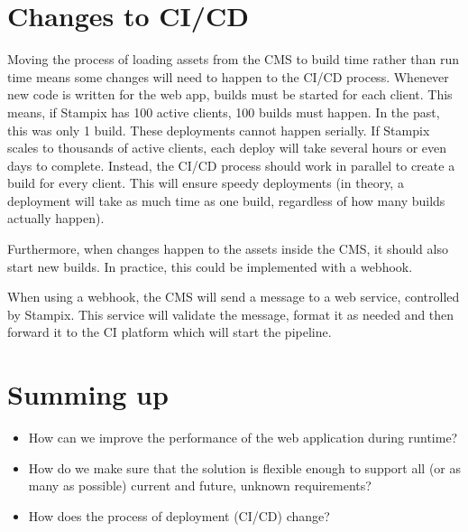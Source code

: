 \section{Changes to CI/CD}

Moving the process of loading assets from the CMS to build time rather than run time means some changes will need to happen to the CI/CD process.
Whenever new code is written for the web app, builds must be started for each client. This means, if Stampix has 100 active clients, 100 builds must happen.
In the past, this was only 1 build. These deployments cannot happen serially. If Stampix scales to thousands of active clients, each deploy will take several hours or even days to complete.
Instead, the CI/CD process should work in parallel to create a build for every client. This will ensure speedy deployments (in theory, a deployment will take as much time as one build, regardless of how many builds actually happen).

Furthermore, when changes happen to the assets inside the CMS, it should also start new builds. In practice, this could be implemented with a webhook.

When using a webhook, the CMS will send a message to a web service, controlled by Stampix. This service will validate the message, format it as needed and then forward it to the CI platform which will start the pipeline.

\section{Summing up}

\begin{itemize}
	\item How can we improve the performance of the web application during runtime?
	\item How do we make sure that the solution is flexible enough to support all (or as many as possible) current and future, unknown requirements?
	\item How does the process of deployment (CI/CD) change?
\end{itemize}